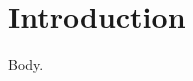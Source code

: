 \documentclass{article}
\begin{document}
\begin{abstract}
Abstract text.
\section*{Keywords}
alpha, beta
\end{abstract}
\section{Introduction}
Body.
\end{document}
